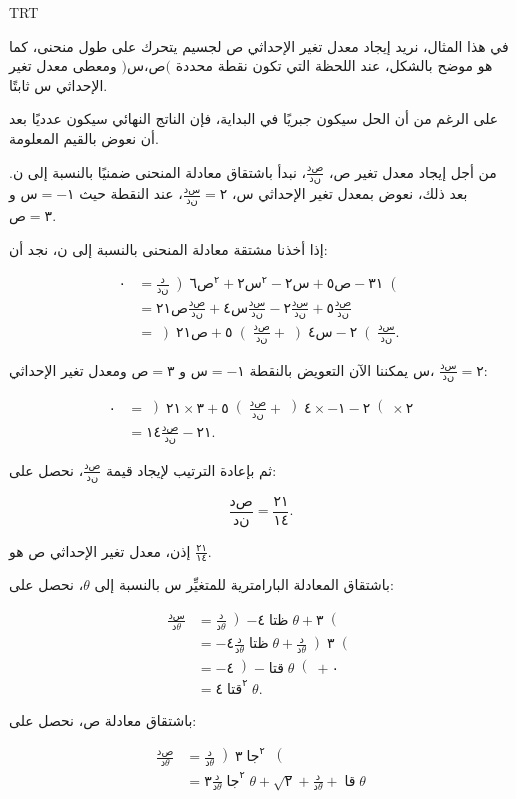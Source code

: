 \documentclass{article}
\DeclareMathOperator{\arSin}{\text{جا}}
\DeclareMathOperator{\arTan}{\text{قا}}
\DeclareMathOperator{\arCot}{\text{قتا}}
\DeclareMathOperator{\arCsc}{\text{ظتا}}
\begin{document}
\mathdir TRT
\parindent 0pt
\pagestyle{empty}

في هذا المثال، نريد إيجاد معدل تغير الإحداثي $𞸑$ لجسيم يتحرك على طول منحنى، كما هو موضح بالشكل، عند اللحظة التي تكون نقطة محددة $)𞸎،𞸑($ ومعطى معدل تغير الإحداثي $𞸎$ ثابتًا.

على الرغم من أن الحل سيكون جبريًا في البداية، فإن الناتج النهائي سيكون عدديًا بعد أن نعوض بالقيم المعلومة.

من أجل إيجاد معدل تغير $𞸑$، $\frac{𞸃𞸑}{𞸃𞸍}$، نبدأ باشتقاق معادلة المنحنى ضمنيًا بالنسبة إلى $𞸍$. بعد ذلك، نعوض بمعدل تغير الإحداثي $𞸎$، $\frac{𞸃𞸎}{𞸃𞸍}=٢$، عند النقطة حيث $𞸎=−١$ و $𞸑=٣$.

إذا أخذنا مشتقة معادلة المنحنى بالنسبة إلى $𞸍$، نجد أن:

\begin{align}
٠	&	=\frac{𞸃}{𞸃𞸍}\left)٦𞸑^٢+٢𞸎^٢−٢𞸎+٥𞸑−٣١\right(	\\
 	&	=٢١𞸑\frac{𞸃𞸑}{𞸃𞸍}+٤𞸎\frac{𞸃𞸎}{𞸃𞸍}−٢\frac{𞸃𞸎}{𞸃𞸍}+٥\frac{𞸃𞸑}{𞸃𞸍}	\\
	&	=\left)٢١𞸑+٥\right(\frac{𞸃𞸑}{𞸃𞸍}+\left)٤𞸎−٢\right(\frac{𞸃𞸎}{𞸃𞸍}.
\end{align}

يمكننا الآن التعويض بالنقطة $𞸎=−١$ و $𞸑=٣$ ومعدل تغير الإحداثي $𞸎$، $\frac{𞸃𞸎}{𞸃𞸍}=٢$:

\begin{align}
٠	&	=\left)٢١×٣+٥\right(\frac{𞸃𞸑}{𞸃𞸍}+\left)٤×−١−٢\right(×٢	\\
	&	=١٤\frac{𞸃𞸑}{𞸃𞸍}−٢١.
\end{align}

ثم بإعادة الترتيب لإيجاد قيمة
$\frac{𞸃𞸑}{𞸃𞸍}$، نحصل على:

\[
\frac{𞸃𞸑}{𞸃𞸍}=\frac{٢١}{١٤}.
\]

إذن، معدل تغير الإحداثي $𞸑$ هو $\frac{٢١}{١٤}$.


باشتقاق المعادلة البارامترية للمتغيِّر $𞸎$ بالنسبة إلى $𝜃$، نحصل على:

\begin{align}
\frac{𞸃𞸎}{𞸃𝜃}	&	=\frac{𞸃}{𞸃𝜃}\left)−٤\arCsc 𝜃+٣\right(	\\
			&	=−٤\frac{𞸃}{𞸃𝜃}\arCsc 𝜃+\frac{𞸃}{𞸃𝜃}\left)٣\right(	\\
		& 	=−٤\left)−\arCot 𝜃\right(+٠	\\
		&	=٤\arCot^٢𝜃.
\end{align}

باشتقاق معادلة $𞸑$، نحصل على:

\begin{align}
\frac{𞸃𞸑}{𞸃𝜃}	&	=\frac{𞸃}{𞸃𝜃} \left)٣\arSin^٢\right(	\\
			&	=٣\frac{𞸃}{𞸃𝜃}\arSin^٢𝜃+\sqrt٢+\frac{𞸃}{𞸃𝜃}+\arTan 𝜃
\end{align}
\end{document}
